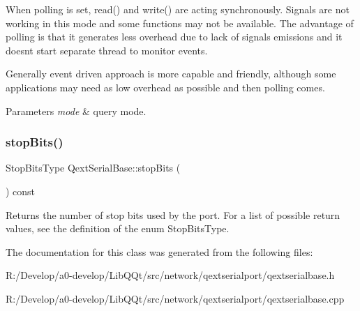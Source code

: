 When polling is set, read() and write() are acting synchronously. Signals are not working in this mode and some functions may not be available. The advantage of polling is that it generates less overhead due to lack of signals emissions and it doesn\textquotesingle{}t start separate thread to monitor events.

Generally event driven approach is more capable and friendly, although some applications may need as low overhead as possible and then polling comes.


\begin{DoxyParams}{Parameters}
{\em mode} & query mode. \\
\hline
\end{DoxyParams}
\mbox{\label{class_qext_serial_base_a9d0d52efbebaa1d832bb9c9b2c40532f}} 
\subsubsection{\texorpdfstring{stop\+Bits()}{stopBits()}}
{\footnotesize\ttfamily Stop\+Bits\+Type Qext\+Serial\+Base\+::stop\+Bits (\begin{DoxyParamCaption}{ }\end{DoxyParamCaption}) const\hspace{0.3cm}{\ttfamily [virtual]}}

Returns the number of stop bits used by the port. For a list of possible return values, see the definition of the enum Stop\+Bits\+Type. 

The documentation for this class was generated from the following files\+:\begin{DoxyCompactItemize}
\item 
R\+:/\+Develop/a0-\/develop/\+Lib\+Q\+Qt/src/network/qextserialport/qextserialbase.\+h\item 
R\+:/\+Develop/a0-\/develop/\+Lib\+Q\+Qt/src/network/qextserialport/qextserialbase.\+cpp\end{DoxyCompactItemize}
